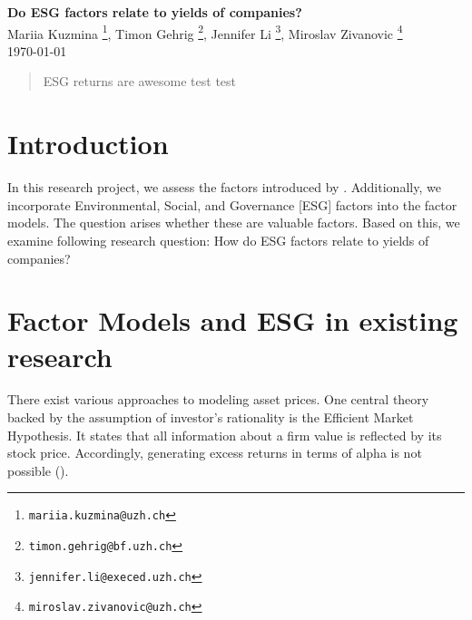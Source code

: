 \documentclass[12pt, a4paper]{article}%
\begin{document}
%
%

\begin{titlepage}

\setlength{\topmargin}{0.5cm}

\center

{\Large \bfseries Do ESG factors relate to yields of companies?
}\\[0.5cm] 

Mariia Kuzmina \footnote{\texttt{mariia.kuzmina@uzh.ch}},
Timon Gehrig \footnote{\texttt{timon.gehrig@bf.uzh.ch}},
Jennifer Li \footnote{\texttt{jennifer.li@execed.uzh.ch}},
Miroslav Zivanovic \footnote{\texttt{miroslav.zivanovic@uzh.ch}}\\
\today
\\ [2cm]

\begin{abstract}
ESG returns are awesome test test 
\end{abstract}

\vspace{3cm}



\vfill 
\end{titlepage}

\tableofcontents


%
%
\newpage
\section{Introduction}
In this research project, we assess the factors introduced by \textcite{FamaFrench1992}. Additionally, we incorporate Environmental, Social, and Governance [ESG] factors into the factor models.
The question arises whether these are valuable factors. Based on this, we examine following research question: How do ESG factors relate to yields of companies?

%
%												   
\section{Factor Models and ESG in existing research}
There exist various approaches to modeling asset prices. One central theory backed by the assumption of investor's rationality is the Efficient Market Hypothesis. It states that all information about a firm value is reflected by its stock price. Accordingly, generating excess returns in terms of alpha is not possible (\textcite{Fama1970}). 
\end{document}
